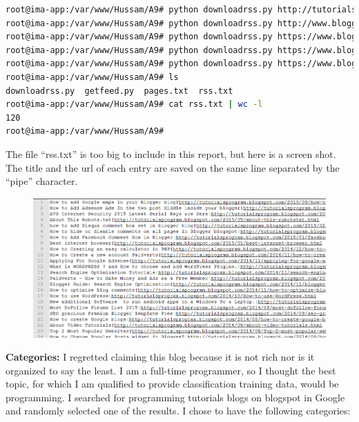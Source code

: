 \documentclass[a4paper, 11pt]{article}
\begin{document}
\begin{lstlisting}[language=bash, breakatwhitespace=〈false), label=Running downloadrss.py, caption= Running downloadrss.py]
root@ima-app:/var/www/Hussam/A9# python downloadrss.py http://tutorialsprogram.blogspot.com/feeds/posts/default
root@ima-app:/var/www/Hussam/A9# python downloadrss.py http://www.blogger.com/feeds/7802129033476755546/posts/default?start-index=26&max-results=25
root@ima-app:/var/www/Hussam/A9# python downloadrss.py https://www.blogger.com/feeds/7802129033476755546/posts/default?start-index=51&max-results=25
root@ima-app:/var/www/Hussam/A9# python downloadrss.py https://www.blogger.com/feeds/7802129033476755546/posts/default?start-index=76&max-results=25
root@ima-app:/var/www/Hussam/A9# python downloadrss.py https://www.blogger.com/feeds/7802129033476755546/posts/default?start-index=101&max-results=25
root@ima-app:/var/www/Hussam/A9# ls
downloadrss.py  getfeed.py  pages.txt  rss.txt
root@ima-app:/var/www/Hussam/A9# cat rss.txt | wc -l
120
root@ima-app:/var/www/Hussam/A9#
\end{lstlisting}

The file ``rss.txt'' is too big to include in this report, but here is a screen shot. The title and the url of each entry are saved on the same line separated by the ``pipe'' character.

\begin{figure}[H]
\centering
\includegraphics[scale=0.6]{rss.png}
\end{figure}

\textbf{Categories:}
I regretted claiming this blog because it is not rich nor is it organized to say the least. I am a full-time programmer, so I thought the best topic, for which I am qualified to provide classification training data, would be programming. I searched for programming tutorials blogs on blogspot in Google and randomly selected one of the results. I chose to have the following categories:
\end{document}
